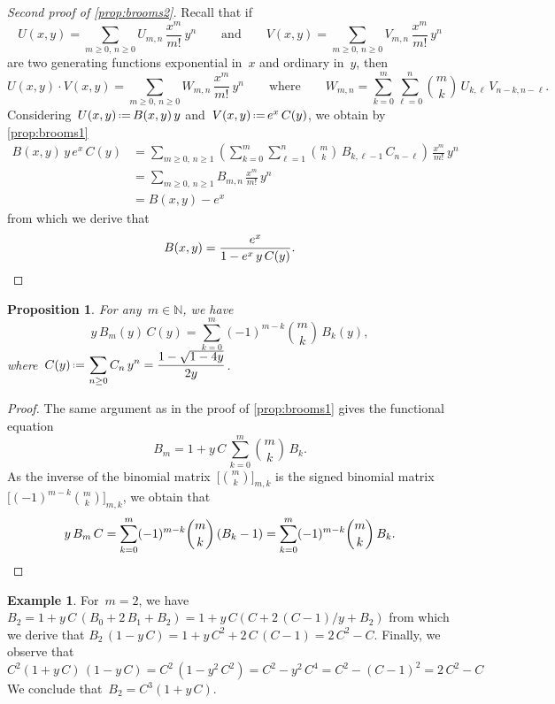 \documentclass{amsart}
\newtheorem{proposition}[theorem]{Proposition}
\theoremstyle{definition}
\newtheorem{example}[theorem]{Example}
\newcommand{\N}{\mathbb{N}} %
\newcommand{\eqdef}{\mbox{\,\raisebox{0.2ex}{\scriptsize\ensuremath{\mathrm:}}\ensuremath{=}\,}} %
\begin{document}
\begin{proof}[Second proof of \cref{prop:brooms2}]
Recall that if
\[
U(x,y) = \sum_{m \ge 0, \, n \ge 0} U_{m,n} \, \frac{x^m}{m!} \, y^n
\qquad\text{and}\qquad
V(x,y) = \sum_{m \ge 0, \, n \ge 0} V_{m,n} \, \frac{x^m}{m!} \, y^n
\]
are two generating functions exponential in~$x$ and ordinary in~$y$, then
\[
U(x,y) \cdot V(x,y) = \sum_{m \ge 0, \, n \ge 0} W_{m,n}  \, \frac{x^m}{m!} \, y^n
\qquad\text{where}\qquad
W_{m,n} = \sum_{k = 0}^m \sum_{\ell = 0}^n \binom{m}{k} \, U_{k,\ell} \, V_{n-k,n-\ell}.
\]
Considering~$U(x,y) \eqdef B(x,y) \, y$ and~$V(x,y) \eqdef e^x \, C(y)$, we obtain by \cref{prop:brooms1}
\begin{align*}
B(x,y) \, y \, e^x \, C(y) & = \sum_{m \ge 0, \, n \ge 1}  \left( \sum_{k = 0}^m \sum_{\ell = 1}^n \binom{m}{k} \, B_{k,\ell-1} \, C_{n-\ell} \right) \, \frac{x^m}{m!} \, y^n \\
& = \sum_{m \ge 0, \, n \ge 1} B_{m,n} \, \frac{x^m}{m!} \, y^n \\
& = B(x,y) - e^x
\end{align*}
from which we derive that
\[
B(x,y) = \frac{e^x}{1-e^x \, y \, C(y)}.
\qedhere
\]
\end{proof}

\begin{proposition}
\label{prop:brooms3}
For any~$m \in \N$, we have
\[
y \, B_m(y) \, C(y) = \sum_{k = 0}^m (-1)^{m-k} \binom{m}{k} \, B_k(y),
\]
where~$\displaystyle C(y) \eqdef \sum_{n \ge 0} C_n \, y^n = \frac{1-\sqrt{1-4y}}{2y}$.
\end{proposition}

\begin{proof}
The same argument as in the proof of \cref{prop:brooms1} gives the functional equation
\[
B_m = 1 + y \, C \, \sum_{k = 0}^m \binom{m}{k} \, B_k.
\]
As the inverse of the binomial matrix~$\big[\binom{m}{k}\big]_{m,k}$ is the signed binomial matrix~$\big[(-1)^{m-k}\binom{m}{k}\big]_{m,k}$, we obtain that
\[
y \, B_m \, C = \sum_{k = 0}^m (-1)^{m-k} \binom{m}{k} \,(B_k - 1) = \sum_{k = 0}^m (-1)^{m-k} \binom{m}{k} \, B_k.
\qedhere
\]
\end{proof}

\begin{example}
For~$m = 2$, we have
\(
B_2 = 1 + y \, C \, (B_0 + 2  \, B_1 + B_2) = 1 + y \, C( C + 2 \, (C - 1) / y + B_2)
\)
from which we derive that
\(
B_2 \, (1 - y \, C) = 1 + y \, C^2 + 2 \, C \, (C - 1) = 2 \, C^2 - C. 
\)
Finally, we observe that
\(
C^2 (1+y \, C) \, ( 1 - y \, C) = C^2 \, (1 - y^2 \, C^2) = C^2 - y^2 \, C^4 = C^2 - (C - 1)^2 = 2 \, C^2 - C
\)
We conclude that~$B_2 = C^3 (1+y \, C)$.
\end{example}
\end{document}
